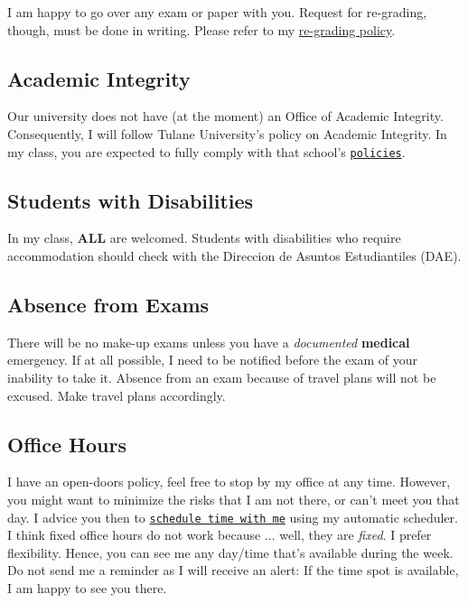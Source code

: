 \documentclass[letterpaper]{article}
\begin{document}
I am happy to go over any exam or paper with you. Request for re-grading, though, must be done in writing. Please refer to my \href{https://github.com/hbahamonde/hbahamonde.github.io/raw/master/resources/ReGrade_Policy.pdf}{re-grading policy}.


\subsection*{Academic Integrity}
Our university does not have (at the moment) an Office of Academic Integrity. Consequently, I will follow Tulane University's policy on Academic Integrity. In my class, you are expected to fully comply with that school's \href{https://college.tulane.edu/code-of-academic-conduct}{\texttt{policies}}. 


\subsection*{Students with Disabilities}
In my class, {\bf ALL} are welcomed. Students with disabilities who require accommodation should check with the {\color{blue}Direccion de Asuntos Estudiantiles (DAE)}.


\subsection*{Absence from Exams}


There will be no make-up exams unless you have a \emph{documented} {\bf medical} emergency. If at all possible, I need to be notified before the exam of your inability to take it. Absence from an exam because of travel plans will not be excused. Make travel plans accordingly. 


\subsection*{Office Hours}

I have an open-doors policy, feel free to stop by my office at any time. However, you might want to minimize the risks that I am not there, or can't meet you that day. I advice you then to \href{https://calendly.com/bahamonde/officehours}{\texttt{schedule time with me}} using my automatic scheduler. I think fixed office hours do not work because ... well, they are \emph{fixed}. I prefer flexibility. Hence, you can see me any day/time that's available during the week. Do not send me a reminder as I will receive an alert: If the time spot is available, I am happy to see you there.
\end{document}
